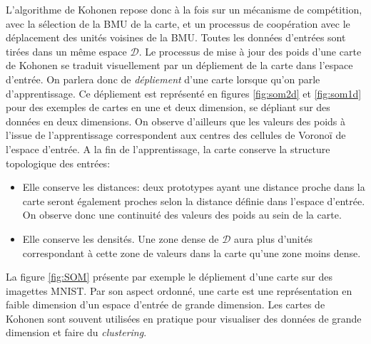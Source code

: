 \documentclass[../main]{subfiles}
\begin{document}
L'algorithme de Kohonen repose donc à la fois sur un mécanisme de compétition, avec la sélection de la BMU de la carte, et un processus de coopération avec le déplacement des unités voisines de la BMU.
Toutes les données d'entrées sont tirées dans un même espace $\mathcal{D}$.
Le processus de mise à jour des poids d'une carte de Kohonen se traduit visuellement par un dépliement de la carte dans l'espace d'entrée. On parlera donc de \emph{dépliement} d'une carte lorsque qu'on parle d'apprentissage. Ce dépliement est représenté en figures \ref{fig:som2d} et \ref{fig:som1d} pour des exemples de cartes en une et deux dimension, se dépliant sur des données en deux dimensions. On observe d'ailleurs que les valeurs des poids à l'issue de l'apprentissage correspondent aux centres des cellules de Voronoï de l'espace d'entrée.
A la fin de l'apprentissage, la carte conserve la structure topologique des entrées:
\begin{itemize}
\item Elle conserve les distances: deux prototypes ayant une distance proche dans la carte seront également proches selon la distance définie dans l'espace d'entrée. On observe donc une continuité des valeurs des poids au sein de la carte.
\item Elle conserve les densités. Une zone dense de $\mathcal{D}$ aura plus d'unités correspondant à cette zone de valeurs dans la carte qu'une zone moins dense.
\end{itemize}
La figure \ref{fig:SOM} présente par exemple le dépliement d'une carte sur des imagettes MNIST.
Par son aspect ordonné, une carte est une représentation en faible dimension d'un espace d'entrée de grande dimension. Les cartes de Kohonen sont souvent utilisées en pratique pour visualiser des données de grande dimension et faire du \emph{clustering}. 


\end{document}
